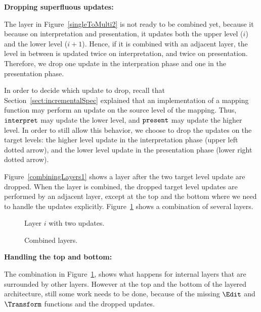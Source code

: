 \bigskip
{\bf Dropping superfluous updates:} 

The layer in Figure~\ref{singleToMulti2} is not ready to be combined yet, because it because on interpretation and presentation, it updates both the upper level ($i$) and the lower level ($i+1$). Hence, if it is combined with an adjacent layer, the level in between is updated twice on interpretation, and twice on presentation. Therefore, we drop one update in the interpration phase and one in the presentation phase. 

In order to decide which update to drop, recall that Section~\ref{sect:incrementalSpec} explained that an implementation of a mapping function may perform an update on the source level of the mapping. Thus, 
${\tt interpret}$ may update the lower level, and ${\tt present}$ may update the higher level. In order to still allow this behavior, we choose to drop the updates on the target levels: the higher level update in the interpretation phase (upper left dotted arrow), and the lower level update in the presentation phase (lower right dotted arrow). 

Figure~\ref{combiningLayers1} shows a layer after the two target level update are dropped. When the layer is combined, the dropped target level updates are performed by an adjacent layer, except at the top and the bottom where we need to handle the updates explicitly. Figure~\ref{combiningLayers2} shows a combination of several layers.

\begin{figure}[h]
  \hfill
  \begin{minipage}[b]{.45\textwidth}
    \begin{center}  
      \caption{Layer $i$ with two updates.} \label{combiningLayers1}
    \end{center}
  \end{minipage}
  \hfill
  \begin{minipage}[b]{.45\textwidth}
    \begin{center}  
      \caption{Combined layers.} \label{combiningLayers2}
    \end{center}
  \end{minipage}
  \hfill
\end{figure}


\bigskip
{\bf Handling the top and bottom:}

The combination in Figure~\ref{combiningLayers2}, shows what happens for internal layers that are surrounded by other layers. However at the top and the bottom of the layered architecture, still some work needs to be done, because of the missing $\Edit$ and $\Transform$ functions and the dropped updates. 

